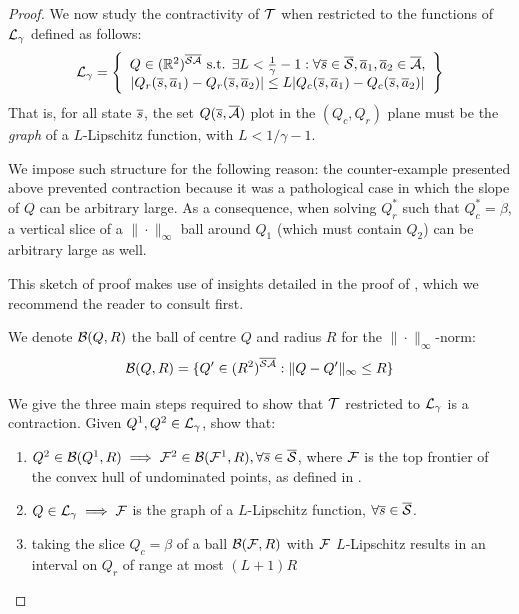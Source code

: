 \subsection{}
\label{proof:contraction-with-smooth}
\begin{proof}
We now study the contractivity of $\mathcal{T}$ when restricted to the functions of $\mathcal{L}_\gamma$ defined as follows:
\begin{equation}
    \mathcal{L}_\gamma = \left\{\begin{array}{cc}
         Q\in(\mathbb{R}^2)^{\overline{\mathcal{S}}\overline{\mathcal{A}}}\text{ s.t. }\exists L<\frac{1}{\gamma}-1: \forall \overline{s}\in\overline{\mathcal{S}},\overline{a}_1,\overline{a}_2\in\overline{\mathcal{A}},   \\
         |Q_r(\overline{s},\overline{a}_1) - Q_r(\overline{s},\overline{a}_2)| \leq L|Q_c(\overline{s},\overline{a}_1) - Q_c(\overline{s},\overline{a}_2)|
    \end{array}\right\}
\end{equation}
That is, for all state $\overline{s}$, the set $Q(\overline{s}, \overline{\mathcal{A}})$ plot in the $(Q_c,Q_r)$ plane must be the \emph{graph} of a $L$-Lipschitz function, with $L<1/\gamma-1$.

We impose such structure for the following reason: the counter-example presented above prevented contraction because it was a pathological case in which the slope of $Q$ can be arbitrary large. As a consequence, when solving $Q_r^*$ such that $Q_c^*=\beta$, a vertical slice of a $\|\cdot\|_\infty$ ball around $Q_1$ (which must contain $Q_2$) can be arbitrary large as well.

This sketch of proof makes use of insights detailed in the proof of , which we recommend the reader to consult first.

We denote $\mathcal{B}(Q,R)$ the ball of centre $Q$ and radius $R$ for the $\|\cdot\|_\infty$-norm:
\begin{equation*}
    \mathcal{B}(Q,R) = \{Q'\in(R^2)^{\overline{\mathcal{S}}\overline{\mathcal{A}}}: \|Q-Q'\|_\infty \leq R\}
\end{equation*}

We give the three main steps required to show that $\mathcal{T}$ restricted to $\mathcal{L}_\gamma$ is a contraction. Given $Q^1, Q^2\in\mathcal{L}_\gamma$, show that:
\begin{enumerate}
    \item $Q^2\in\mathcal{B}(Q^1,R)\implies\mathcal{F}^2\in\mathcal{B}(\mathcal{F}^1, R), \forall\overline{s}\in\overline{\mathcal{S}}$, where $\mathcal{F}$ is the top frontier of the convex hull of undominated points, as defined in .
    \item $Q\in\mathcal{L}_\gamma \implies \mathcal{F}$ is the graph of a $L$-Lipschitz function, $\forall\overline{s}\in\overline{\mathcal{S}}$.
    \item taking the slice $Q_c=\beta$ of a ball $\mathcal{B}(\mathcal{F},R)$ with $\mathcal{F}$ $L$-Lipschitz results in an interval on $Q_r$ of range at most $(L+1)R$
\end{enumerate}


\end{proof}
